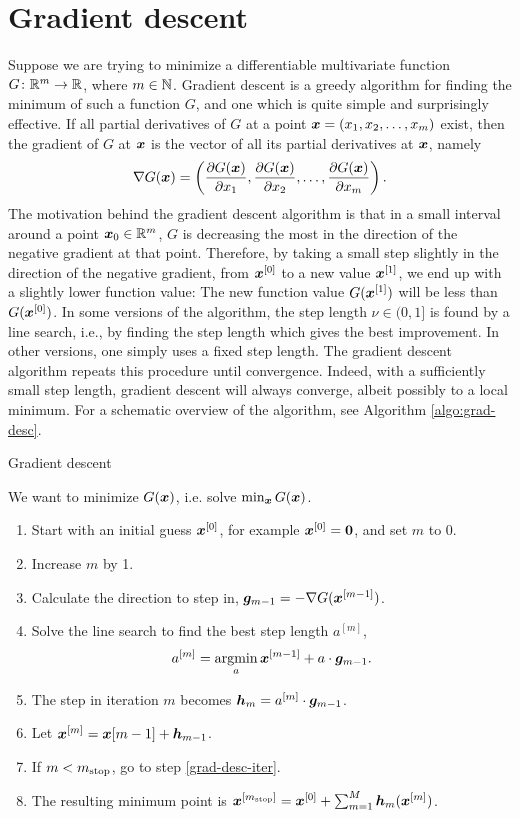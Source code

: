 \section{Gradient descent}
Suppose we are trying to minimize a differentiable multivariate function $G\colon\mathbb{R}^m\to\mathbb{R}$, where $m\in\mathbb{N}$. Gradient descent is a greedy algorithm for finding the minimum of such a function $G$, and one which is quite simple and surprisingly effective. If all partial derivatives of $G$ at a point $\bm{x}=(x_1,x_2,\ldots,x_m)$ exist, then the gradient of $G$ at $\bm{x}$ is the vector of all its partial derivatives at $\bm{x}$, namely
\begin{equation*}
    \nabla G(\bm{x})=\left(\frac{\partial G(\bm{x})}{\partial x_1},\frac{\partial G(\bm{x})}{\partial x_2},\ldots,\frac{\partial G(\bm{x})}{\partial x_m}\right).
\end{equation*}
The motivation behind the gradient descent algorithm is that in a small interval around a point $\bm{x}_0\in\mathbb{R}^m$, $G$ is decreasing the most in the direction of the negative gradient at that point. Therefore, by taking a small step slightly in the direction of the negative gradient, from $\bm{x}^{[0]}$ to a new value $\bm{x}^{[1]}$, we end up with a slightly lower function value: The new function value $G(\bm{x}^{[1]})$ will be less than $G(\bm{x}^{[0]})$. In some versions of the algorithm, the step length $\nu\in(0,1]$ is found by a line search, i.e., by finding the step length which gives the best improvement. In other versions, one simply uses a fixed step length. The gradient descent algorithm repeats this procedure until convergence. Indeed, with a sufficiently small step length, gradient descent will always converge, albeit possibly to a local minimum. For a schematic overview of the algorithm, see Algorithm \ref{algo:grad-desc}.
\begin{algorithm}
\caption{Gradient descent}
\label{algo:grad-desc}
We want to minimize $G(\bm{x})$, i.e. solve $\min_{\bm{x}}G(\bm{x})$.
\begin{enumerate}
    \item Start with an initial guess $\bm{x}^{[0]}$, for example $\bm{x}^{[0]}=\bm{0}$, and set $m$ to 0.
    \item\label{grad-desc-iter} Increase $m$ by 1.
    \item Calculate the direction to step in, $\bm{g}_{m-1}=-\nabla G(\bm{x}^{[m-1]})$.
    \item Solve the line search to find the best step length $a^{[m]}$,
        \begin{equation*}
            a^{[m]}=\operatorname*{argmin}_{a}\bm{x}^{[m-1]}+a\cdot\bm{g}_{m-1}.
        \end{equation*}
    \item The step in iteration $m$ becomes $\bm{h}_m=a^{[m]}\cdot\bm{g}_{m-1}$.
    \item Let $\bm{x}^{[m]}=\bm{x}{[m-1]}+\bm{h}_{m-1}$.
    \item If $m<m_{\text{stop}}$, go to step \eqref{grad-desc-iter}.
    \item The resulting minimum point is $\bm{x}^{[m_{\text{stop}}]}=\bm{x}^{[0]}+\sum_{m=1}^M\bm{h}_m(\bm{x}^{[m]})$.
\end{enumerate}
\end{algorithm}
